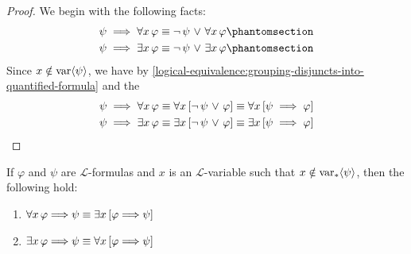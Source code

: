 \begin{proof}
    We begin with the following facts:
    \begin{align*}
        \psi \implies \forall x \, \varphi \equiv \lnot \, \psi \,\,{\lor}\,\, \forall x \, \varphi \phantomsection\\
        \psi \implies \exists x \, \varphi \equiv \lnot \, \psi \,\,{\lor}\,\, \exists x \, \varphi \phantomsection
    \end{align*}
    Since \( x \notin \operatorname{var} \langle\psi\rangle \), we have by \cref{logical-equivalence:grouping-disjuncts-into-quantified-formula}
    and the 
    \begin{gather*}
        \psi \implies \forall x \, \varphi \equiv \forall x \, \mleft[ \lnot \, \psi \,\,{\lor}\,\, \varphi \mright]
        \equiv \forall x \, \mleft[ \psi \implies \varphi \mright]\\
        \psi \implies \exists x \, \varphi \equiv \exists x \, \mleft[ \lnot \, \psi \,\,{\lor}\,\, \varphi \mright]
        \equiv \exists x \, \mleft[ \psi \implies  \varphi \mright] \qedhere
    \end{gather*}
\end{proof}

\begin{thm}
     \label{logical-equivalence:grouping-consequent-into-quantified-antecedent}
    If \( \varphi \) and \( \psi \) are \( \mathcal{L} \)-formulas and \( x \) is an \( \mathcal{L} \)-variable such that \( x \notin \operatorname{var}_{\ast} \langle\psi\rangle \), then
    the following hold:
    \begin{enumerate}[topsep=2pt,label=\textup{\texttt{(\alph*)}}]
        \item \( \forall x \, \varphi {\implies} \psi \equiv \exists x \, \mleft[ \varphi {\implies} \psi \mright] \)  \label{enum:universal-antecedent}
        \item \( \exists x \, \varphi {\implies} \psi \equiv \forall x \, \mleft[ \varphi {\implies} \psi \mright] \)  \label{enum:existential-antecedent}
    \end{enumerate}
\end{thm}

